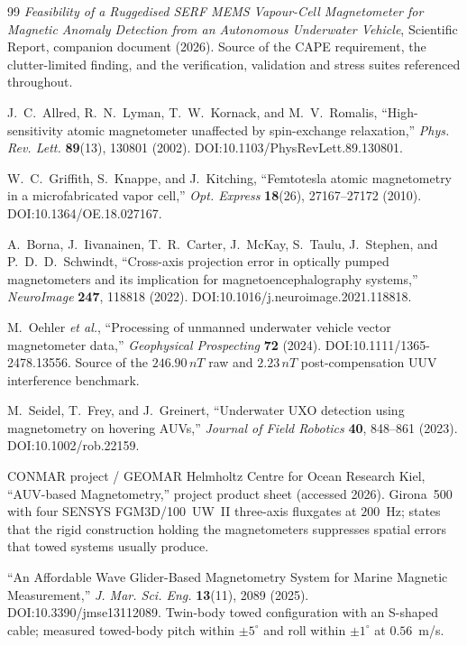 \documentclass[11pt]{article}
\newcommand{\nT}{\,nT}\newcommand{\pT}{\,pT}\newcommand{\fT}{\,fT}
\begin{document}
\begin{thebibliography}{99}\small
{} \emph{Feasibility of a Ruggedised SERF MEMS Vapour-Cell
Magnetometer for Magnetic Anomaly Detection from an Autonomous Underwater
Vehicle}, Scientific Report, companion document (2026). Source of the CAPE
requirement, the clutter-limited finding, and the verification, validation and
stress suites referenced throughout.

 J.~C.~Allred, R.~N.~Lyman, T.~W.~Kornack, and M.~V.~Romalis,
``High-sensitivity atomic magnetometer unaffected by spin-exchange relaxation,''
\emph{Phys. Rev. Lett.} \textbf{89}(13), 130801 (2002).
DOI:10.1103/PhysRevLett.89.130801.

 W.~C.~Griffith, S.~Knappe, and J.~Kitching, ``Femtotesla
atomic magnetometry in a microfabricated vapor cell,'' \emph{Opt. Express}
\textbf{18}(26), 27167--27172 (2010). DOI:10.1364/OE.18.027167.

 A.~Borna, J.~Iivanainen, T.~R.~Carter, J.~McKay, S.~Taulu,
J.~Stephen, and P.~D.~D.~Schwindt, ``Cross-axis projection error in optically
pumped magnetometers and its implication for magnetoencephalography systems,''
\emph{NeuroImage} \textbf{247}, 118818 (2022).
DOI:10.1016/j.neuroimage.2021.118818.

 M.~Oehler \emph{et al.}, ``Processing of unmanned underwater
vehicle vector magnetometer data,'' \emph{Geophysical Prospecting} \textbf{72}
(2024). DOI:10.1111/1365-2478.13556. Source of the $246.90\nT$ raw and
$2.23\nT$ post-compensation UUV interference benchmark.

 M.~Seidel, T.~Frey, and J.~Greinert, ``Underwater UXO
detection using magnetometry on hovering AUVs,'' \emph{Journal of Field
Robotics} \textbf{40}, 848--861 (2023). DOI:10.1002/rob.22159.

 CONMAR project / GEOMAR Helmholtz Centre for Ocean
Research Kiel, ``AUV-based Magnetometry,'' project product sheet (accessed
2026). Girona~500 with four SENSYS FGM3D/100~UW~II three-axis fluxgates at
$200$~Hz; states that the rigid construction holding the magnetometers
suppresses spatial errors that towed systems usually produce.

 ``An Affordable Wave Glider-Based Magnetometry System
for Marine Magnetic Measurement,'' \emph{J. Mar. Sci. Eng.} \textbf{13}(11),
2089 (2025). DOI:10.3390/jmse13112089. Twin-body towed configuration with an
S-shaped cable; measured towed-body pitch within $\pm5^\circ$ and roll within
$\pm1^\circ$ at $0.56$~m/s.


\end{thebibliography}
\end{document}
